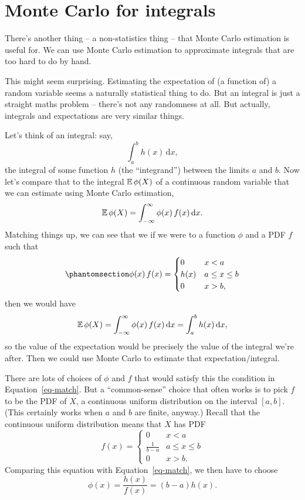 \documentclass[
  letterpaper,
  DIV=11,
  numbers=noendperiod]{scrreprt}
\theoremstyle{plain}
\theoremstyle{definition}
\theoremstyle{definition}
\theoremstyle{remark}
\begin{document}
\section{Monte Carlo for integrals}\label{monte-carlo-for-integrals}

There's another thing -- a non-statistics thing -- that Monte Carlo
estimation is useful for. We can use Monte Carlo estimation to
approximate integrals that are too hard to do by hand.

This might seem surprising. Estimating the expectation of (a function
of) a random variable seems a naturally statistical thing to do. But an
integral is just a straight maths problem -- there's not any randomness
at all. But actually, integrals and expectations are very similar
things.

Let's think of an integral: say, \[ \int_a^b h(x) \,\mathrm{d}x ,\] the
integral of some function \(h\) (the ``integrand'') between the limits
\(a\) and \(b\). Now let's compare that to the integral \(\operatorname{\mathbb{E}} \phi(X)\)
of a continuous random variable that we can estimate using Monte Carlo
estimation,
\[ \operatorname{\mathbb{E}} \phi(X) = \int_{-\infty}^\infty \phi(x)\,f(x)\, \mathrm{d} x. \]
Matching things up, we can see that we if we were to a function \(\phi\)
and a PDF \(f\) such that
\begin{equation}\phantomsection\label{eq-match}{ \phi(x)\,f(x) = \begin{cases} 0 & x < a \\ h(x) & a \leq x \leq b \\ 0 & x > b , \end{cases} }\end{equation}
then we would have
\[ \operatorname{\mathbb{E}} \phi(X) = \int_{-\infty}^\infty \phi(x)\,f(x)\, \mathrm{d} x = \int_a^b h(x) \,\mathrm{d}x, \]
so the value of the expectation would be precisely the value of the
integral we're after. Then we could use Monte Carlo to estimate that
expectation/integral.

There are lots of choices of \(\phi\) and \(f\) that would satisfy this
the condition in Equation~\ref{eq-match}. But a ``common-sense'' choice
that often works is to pick \(f\) to be the PDF of \(X\), a continuous
uniform distribution on the interval \([a,b]\). (This certainly works
when \(a\) and \(b\) are finite, anyway.) Recall that the continuous
uniform distribution means that \(X\) has PDF
\[ f(x) = \begin{cases} 0 & x < a \\ \displaystyle{\frac{1}{b-a}} & a \leq x \leq b \\ 0 & x > b . \end{cases} \]
Comparing this equation with Equation~\ref{eq-match}, we then have to
choose \[\phi(x) = \frac{h(x)}{f(x)} = (b-a)h(x).\]
\end{document}
